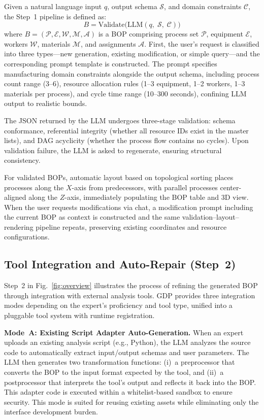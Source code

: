 \documentclass[conference]{IEEEtran}
\begin{document}
Given a natural language input $q$, output schema $\mathcal{S}$, and domain constraints $\mathcal{C}$, the Step~1 pipeline is defined as:
\begin{equation}
B = \mathrm{Validate}\bigl(\mathrm{LLM}(q,\;\mathcal{S},\;\mathcal{C})\bigr)
\label{eq:step1}
\end{equation}
where $B = (\mathcal{P}, \mathcal{E}, \mathcal{W}, \mathcal{M}, \mathcal{A})$ is a BOP comprising process set $\mathcal{P}$, equipment $\mathcal{E}$, workers $\mathcal{W}$, materials $\mathcal{M}$, and assignments $\mathcal{A}$. First, the user's request is classified into three types---new generation, existing modification, or simple query---and the corresponding prompt template is constructed. The prompt specifies manufacturing domain constraints alongside the output schema, including process count range (3--6), resource allocation rules (1--3 equipment, 1--2 workers, 1--3 materials per process), and cycle time range (10--300 seconds), confining LLM output to realistic bounds.

The JSON returned by the LLM undergoes three-stage validation: schema conformance, referential integrity (whether all resource IDs exist in the master lists), and DAG acyclicity (whether the process flow contains no cycles). Upon validation failure, the LLM is asked to regenerate, ensuring structural consistency.

For validated BOPs, automatic layout based on topological sorting places processes along the $X$-axis from predecessors, with parallel processes center-aligned along the $Z$-axis, immediately populating the BOP table and 3D view. When the user requests modifications via chat, a modification prompt including the current BOP as context is constructed and the same validation--layout--rendering pipeline repeats, preserving existing coordinates and resource configurations.

\subsection{Tool Integration and Auto-Repair (Step~2)}

Step~2 in Fig.~\ref{fig:overview} illustrates the process of refining the generated BOP through integration with external analysis tools. GDP provides three integration modes depending on the expert's proficiency and tool type, unified into a pluggable tool system with runtime registration.

\textbf{Mode~A: Existing Script Adapter Auto-Generation.}
When an expert uploads an existing analysis script (e.g., Python), the LLM analyzes the source code to automatically extract input/output schemas and user parameters. The LLM then generates two transformation functions: (i)~a preprocessor that converts the BOP to the input format expected by the tool, and (ii)~a postprocessor that interprets the tool's output and reflects it back into the BOP. This adapter code is executed within a whitelist-based sandbox to ensure security. This mode is suited for reusing existing assets while eliminating only the interface development burden.
\end{document}
